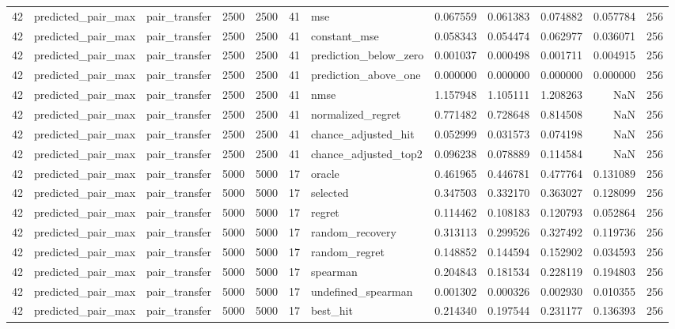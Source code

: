 \begin{tabular}{rllrrrlrrrrr}
42 & predicted_pair_max & pair_transfer & 2500 & 2500 & 41 & mse & 0.067559 & 0.061383 & 0.074882 & 0.057784 & 256 \\
42 & predicted_pair_max & pair_transfer & 2500 & 2500 & 41 & constant_mse & 0.058343 & 0.054474 & 0.062977 & 0.036071 & 256 \\
42 & predicted_pair_max & pair_transfer & 2500 & 2500 & 41 & prediction_below_zero & 0.001037 & 0.000498 & 0.001711 & 0.004915 & 256 \\
42 & predicted_pair_max & pair_transfer & 2500 & 2500 & 41 & prediction_above_one & 0.000000 & 0.000000 & 0.000000 & 0.000000 & 256 \\
42 & predicted_pair_max & pair_transfer & 2500 & 2500 & 41 & nmse & 1.157948 & 1.105111 & 1.208263 & NaN & 256 \\
42 & predicted_pair_max & pair_transfer & 2500 & 2500 & 41 & normalized_regret & 0.771482 & 0.728648 & 0.814508 & NaN & 256 \\
42 & predicted_pair_max & pair_transfer & 2500 & 2500 & 41 & chance_adjusted_hit & 0.052999 & 0.031573 & 0.074198 & NaN & 256 \\
42 & predicted_pair_max & pair_transfer & 2500 & 2500 & 41 & chance_adjusted_top2 & 0.096238 & 0.078889 & 0.114584 & NaN & 256 \\
42 & predicted_pair_max & pair_transfer & 5000 & 5000 & 17 & oracle & 0.461965 & 0.446781 & 0.477764 & 0.131089 & 256 \\
42 & predicted_pair_max & pair_transfer & 5000 & 5000 & 17 & selected & 0.347503 & 0.332170 & 0.363027 & 0.128099 & 256 \\
42 & predicted_pair_max & pair_transfer & 5000 & 5000 & 17 & regret & 0.114462 & 0.108183 & 0.120793 & 0.052864 & 256 \\
42 & predicted_pair_max & pair_transfer & 5000 & 5000 & 17 & random_recovery & 0.313113 & 0.299526 & 0.327492 & 0.119736 & 256 \\
42 & predicted_pair_max & pair_transfer & 5000 & 5000 & 17 & random_regret & 0.148852 & 0.144594 & 0.152902 & 0.034593 & 256 \\
42 & predicted_pair_max & pair_transfer & 5000 & 5000 & 17 & spearman & 0.204843 & 0.181534 & 0.228119 & 0.194803 & 256 \\
42 & predicted_pair_max & pair_transfer & 5000 & 5000 & 17 & undefined_spearman & 0.001302 & 0.000326 & 0.002930 & 0.010355 & 256 \\
42 & predicted_pair_max & pair_transfer & 5000 & 5000 & 17 & best_hit & 0.214340 & 0.197544 & 0.231177 & 0.136393 & 256 \\

\end{tabular}
